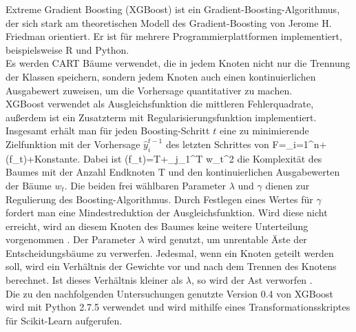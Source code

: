 Extreme Gradient Boosting (XGBoost) \cite{DBLP:journals/corr/ChenG16} ist ein Gradient-Boosting-Algorithmus, der sich stark am theoretischen Modell des Gradient-Boosting von Jerome H. Friedman \cite{Friedman00greedyfunction} orientiert. Er ist f\"ur mehrere Programmierplattformen implementiert, beispielsweise R und Python.\\
Es werden CART B\"aume verwendet, die in jedem Knoten nicht nur die Trennung der Klassen speichern, sondern jedem Knoten auch einen kontinuierlichen Ausgabewert zuweisen, um die Vorhersage quantitativer zu machen.\\
XGBoost verwendet als Ausgleichsfunktion die mittleren Fehlerquadrate, au\ss erdem ist ein Zusatzterm mit Regularisierungsfunktion implementiert. Insgesamt erh\"alt man f\"ur jeden Boosting-Schritt $t$ eine zu minimierende Zielfunktion mit der Vorhersage $\hat y_i^{t-1}$ des letzten Schrittes von
\beq
F=\sum_{i=1}^n+\Omega\left(f_t\right)+Konstante.
\label{eq:xgb_zielfkt}
\eeq
Dabei ist
\beq
\Omega\left(f_t\right)=\gamma T+\lambda\sum_{j_1}^T w_t^2
\label{eq:complexity}
\eeq
die Komplexit\"at des Baumes mit der Anzahl Endknoten T und den kontinuierlichen Ausgabewerten der B\"aume $w_t$. Die beiden frei w\"ahlbaren Parameter $\lambda$ und $\gamma$ dienen zur Regulierung des Boosting-Algorithmus. Durch Festlegen eines Wertes f\"ur $\gamma$ fordert man eine Mindestreduktion der Ausgleichsfunktion. Wird diese nicht erreicht, wird an diesem Knoten des Baumes keine weitere Unterteilung vorgenommen \cite{xgb_skl_wrapper}. Der Parameter $\lambda$ wird genutzt, um unrentable \"Aste der Entscheidungsb\"aume zu verwerfen. Jedesmal, wenn ein Knoten geteilt werden soll, wird ein Verh\"altnis der Gewichte vor und nach dem Trennen des Knotens berechnet. Ist dieses Verh\"altnis kleiner als $\lambda$, so wird der Ast verworfen \cite{xgb_tree}.\\
Die zu den nachfolgenden Untersuchungen genutzte Version 0.4 von XGBoost wird mit Python 2.7.5 verwendet und wird mithilfe eines Transformationsskriptes f\"ur Scikit-Learn aufgerufen.
